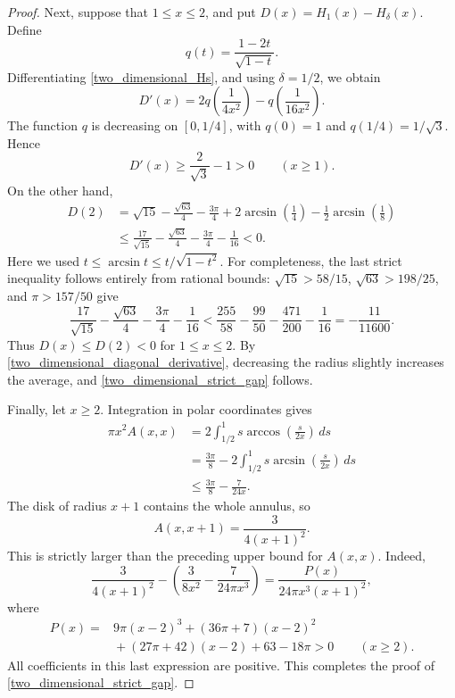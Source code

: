 \documentclass[10pt,a4paper]{amsart}
\begin{document}
\begin{proof}
Next, suppose that $1\leq x\leq2$, and put
$D(x)=H_1(x)-H_\delta(x)$. Define
\[
q(t)=\frac{1-2t}{\sqrt{1-t}}.
\]
Differentiating \eqref{two_dimensional_Hs}, and using $\delta=1/2$,
we obtain
\[
D'(x)=2q\!\left(\frac{1}{4x^2}\right)
          -q\!\left(\frac{1}{16x^2}\right).
\]
The function $q$ is decreasing on $[0,1/4]$, with $q(0)=1$ and
$q(1/4)=1/\sqrt3$. Hence
\[
D'(x)\geq\frac{2}{\sqrt3}-1>0\qquad(x\geq1).
\]
On the other hand,
\begin{align*}
D(2)
&=\sqrt{15}-\frac{\sqrt{63}}4-\frac{3\pi}{4}
  +2\arcsin\!\left(\frac14\right)
  -\frac12\arcsin\!\left(\frac18\right)\\
&\leq\frac{17}{\sqrt{15}}-\frac{\sqrt{63}}4
      -\frac{3\pi}{4}-\frac1{16}<0.
\end{align*}
Here we used $t\leq\arcsin t\leq t/\sqrt{1-t^2}$.
For completeness, the last strict inequality follows entirely from
rational bounds: $\sqrt{15}>58/15$, $\sqrt{63}>198/25$, and
$\pi>157/50$ give
\[
\frac{17}{\sqrt{15}}-\frac{\sqrt{63}}4-\frac{3\pi}{4}-\frac1{16}
<\frac{255}{58}-\frac{99}{50}-\frac{471}{200}-\frac1{16}
=-\frac{11}{11600}.
\]
Thus $D(x)\leq D(2)<0$ for $1\leq x\leq2$. By
\eqref{two_dimensional_diagonal_derivative}, decreasing the radius
slightly increases the average, and \eqref{two_dimensional_strict_gap}
follows.

Finally, let $x\geq2$. Integration in polar coordinates gives
\begin{align*}
\pi x^2 A(x,x)
&=2\int_{1/2}^1 s\arccos\!\left(\frac{s}{2x}\right)\,ds\\
&=\frac{3\pi}{8}
  -2\int_{1/2}^1 s\arcsin\!\left(\frac{s}{2x}\right)\,ds\\
&\leq\frac{3\pi}{8}-\frac{7}{24x}.
\end{align*}
The disk of radius $x+1$ contains the whole annulus, so
\[
A(x,x+1)=\frac{3}{4(x+1)^2}.
\]
This is strictly larger than the preceding upper bound for $A(x,x)$.
Indeed,
\[
\frac{3}{4(x+1)^2}
-\left(\frac{3}{8x^2}-\frac{7}{24\pi x^3}\right)
=\frac{P(x)}{24\pi x^3(x+1)^2},
\]
where
\begin{align*}
P(x)={}&9\pi(x-2)^3+(36\pi+7)(x-2)^2\\
       &{}+(27\pi+42)(x-2)+63-18\pi>0
       \qquad(x\geq2).
\end{align*}
All coefficients in this last expression are positive. This completes
the proof of \eqref{two_dimensional_strict_gap}.
\end{proof}
\end{document}
